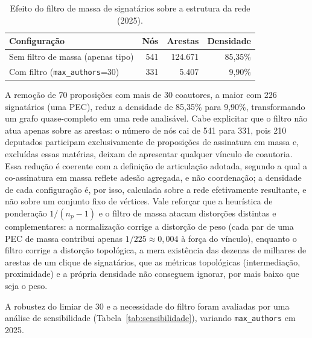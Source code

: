 \documentclass[
      12pt,
      a4paper,
      openright,
      oneside,
      chapter=TITLE,
      section=TITLE,
      english,
      french,
      spanish,
      brazilian
    ]{abntex2}
\begin{document}
    \begin{table}[H]
    \centering
    \caption{Efeito do filtro de massa de signatários sobre a estrutura da rede (2025).}
    \label{tab:filtros}
    \begin{tabular}{lrrr}
    \toprule
    \textbf{Configuração} & \textbf{Nós} & \textbf{Arestas} & \textbf{Densidade} \\
    \midrule
    Sem filtro de massa (apenas tipo)      & 541 & 124.671 & 85,35\% \\
    Com filtro (\texttt{max\_authors}=30)  & 331 & 5.407   & 9,90\%  \\
    \bottomrule
    \end{tabular}
    \end{table}
    
    A remoção de 70 proposições com mais de 30 coautores, a maior com 226 signatários (uma PEC), reduz a densidade de 85,35\% para 9,90\%, transformando um grafo quase-completo em uma rede analisável. Cabe explicitar que o filtro não atua apenas sobre as arestas: o número de nós cai de 541 para 331, pois 210 deputados participam exclusivamente de proposições de assinatura em massa e, excluídas essas matérias, deixam de apresentar qualquer vínculo de coautoria. Essa redução é coerente com a definição de articulação adotada, segundo a qual a co-assinatura em massa reflete adesão agregada, e não coordenação; a densidade de cada configuração é, por isso, calculada sobre a rede efetivamente resultante, e não sobre um conjunto fixo de vértices. Vale reforçar que a heurística de ponderação $1/(n_p-1)$ e o filtro de massa atacam distorções distintas e complementares: a normalização corrige a distorção de peso (cada par de uma PEC de massa contribui apenas $1/225 \approx 0{,}004$ à força do vínculo), enquanto o filtro corrige a distorção topológica, a mera existência das dezenas de milhares de arestas de um clique de signatários, que as métricas topológicas (intermediação, proximidade) e a própria densidade não conseguem ignorar, por mais baixo que seja o peso.
    
    A robustez do limiar de 30 e a necessidade do filtro foram avaliadas por uma análise de sensibilidade (Tabela~\ref{tab:sensibilidade}), variando \texttt{max\_authors} em 2025.
    
\end{document}
